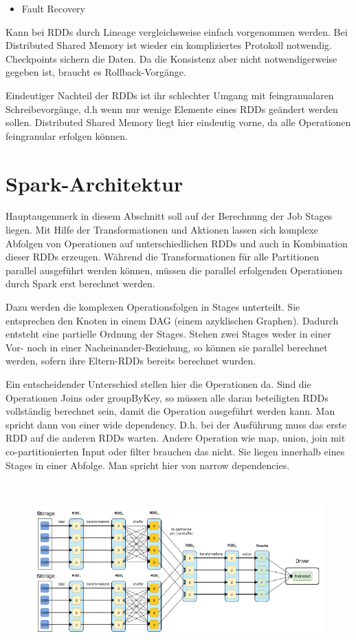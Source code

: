 \documentclass[letterpaper]{article}
\begin{document}
\begin{itemize}
\item Fault Recovery
\end{itemize}
Kann bei RDDs durch Lineage vergleichsweise einfach vorgenommen werden.
Bei Distributed Shared Memory ist wieder ein kompliziertes Protokoll
notwendig. Checkpoints sichern die Daten. Da die Konsistenz aber nicht
notwendigerweise gegeben ist, braucht es Rollback-Vorgänge. 

Eindeutiger Nachteil der RDDs ist ihr schlechter Umgang mit
feingranualaren Schreibevorgänge, d.h wenn nur wenige Elemente eines
RDDs geändert werden sollen. Distributed Shared Memory liegt hier
eindeutig vorne, da alle Operationen feingranular erfolgen können.

\section[Spark{}-Architektur]{\rmfamily
Spark-Architektur}
Hauptaugenmerk in diesem Abschnitt soll auf der Berechnung der Job
Stages liegen. Mit Hilfe der Transformationen und Aktionen lassen sich
komplexe Abfolgen von Operationen auf unterschiedlichen RDDs und auch
in Kombination dieser RDDs erzeugen. Während die Transformationen für
alle Partitionen parallel ausgeführt werden können, müssen die parallel
erfolgenden Operationen durch Spark erst berechnet werden.

Dazu werden die komplexen Operationsfolgen in Stages unterteilt. Sie
entsprechen den Knoten in einem DAG (einem azyklischen Graphen).
Dadurch entsteht eine partielle Ordnung der Stages. Stehen zwei Stages
weder in einer Vor- noch in einer Nacheinander-Beziehung, so können sie
parallel berechnet werden, sofern ihre Eltern-RDDs bereits berechnet
wurden. 

Ein entscheidender Unterschied stellen hier die Operationen da. Sind die
Operationen Joins oder groupByKey, so müssen alle daran beteiligten
RDDs vollständig berechnet sein, damit die Operation ausgeführt werden
kann. Man spricht dann von einer wide dependency. D.h. bei der
Ausführung muss das erste RDD auf die anderen RDDs warten. Andere
Operation wie map, union, join mit co-partitionierten Input oder filter
brauchen das nicht. Sie liegen innerhalb eines Stages in einer Abfolge.
Man spricht hier von narrow dependencies.

\begin{figure}
\centering
\includegraphics[width=15.24cm,height=6.765cm]{bilder/Seminartext-img2.png}
\end{figure}
\end{document}
